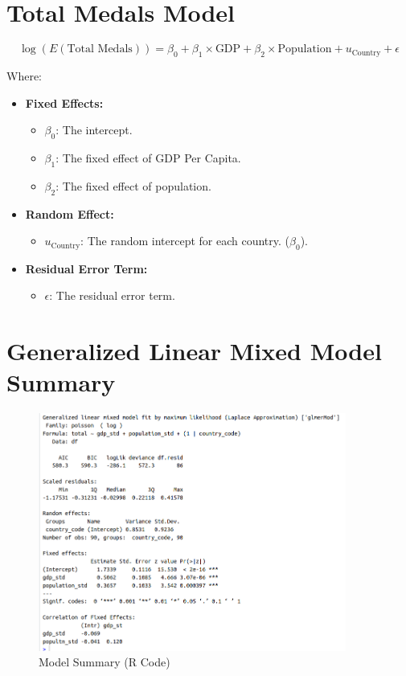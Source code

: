 \documentclass[a4paper,12pt]{article}
\begin{document}
\clearpage
\section{Total Medals Model }


\[
\log(E(\text{Total Medals})) = \beta_0 + \beta_1 \times \text{GDP} + \beta_2 \times \text{Population} + u_{\text{Country}} + \epsilon
\]




Where:
\begin{itemize}
	\item \textbf{Fixed Effects:}
	\begin{itemize}
		 \item $\beta_0$: The intercept.
		\item $\beta_1$: The fixed effect of GDP Per Capita.
		\item $\beta_2$: The fixed effect of population.
		\end{itemize}
	\item \textbf{Random Effect:}
	\begin{itemize}
		\item $u_{\text{Country}}$:  The random intercept for each country. ($\beta_0$).
	\end{itemize}
	\item \textbf{Residual Error Term:}
	\begin{itemize}
		\item $\epsilon$: The residual error term.
	\end{itemize}
\end{itemize}










\section*{Generalized Linear Mixed Model Summary}



\begin{figure}[H]
    \centering
    \includegraphics[width=0.9\textwidth]{images/summary.png}
    \caption{Model Summary (R Code)}
    \label{fig:dataset_fig_10}
\end{figure}
\end{document}
